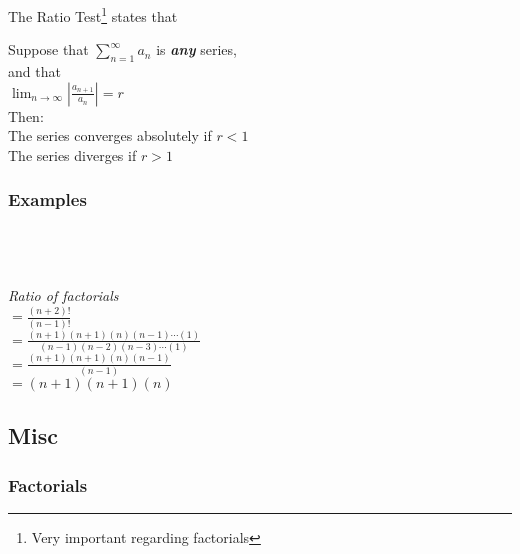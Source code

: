 \documentclass{article}
\begin{document}
    The Ratio Test\footnote{Very important regarding factorials} states that 
        
        \begingroup
        \centering
        Suppose that $\displaystyle \sum_{n=1}^{\infty} a_n$ is \textit{\textbf{any}} series,\\
        and that\\[5pt]
        $\displaystyle \lim_{n \rightarrow \infty} \left| \frac{a_{n+1}}{a_n} \right| = r$\\[10pt]
        Then: \\[5pt]
        The series converges absolutely if $r < 1$\\
        The series diverges if $r > 1$\\
        \endgroup

    \subsubsection{Examples}

        \begingroup
        \centering

        \\

        \hrulefill \\[10pt]

        \\[5pt]
        \textit{Ratio of factorials}\\[15pt]

        $=\frac{(n+2)!}{(n-1)!}$\\[15pt]
        
        $= \frac{(n+1)(n+1)(n)(n-1)\cdots(1)}{(n-1)(n-2)(n-3)\cdots(1)}$\\[15pt]
        
        $= \frac{(n+1)(n+1)(n)(n-1)}{(n-1)}$\\[15pt]

        $= {(n+1)(n+1)(n)}$\\[15pt]

        \endgroup
    \pagebreak



\subsection{\centering \huge Misc}
    \centering
    \subsubsection{\huge Factorials}
\end{document}
